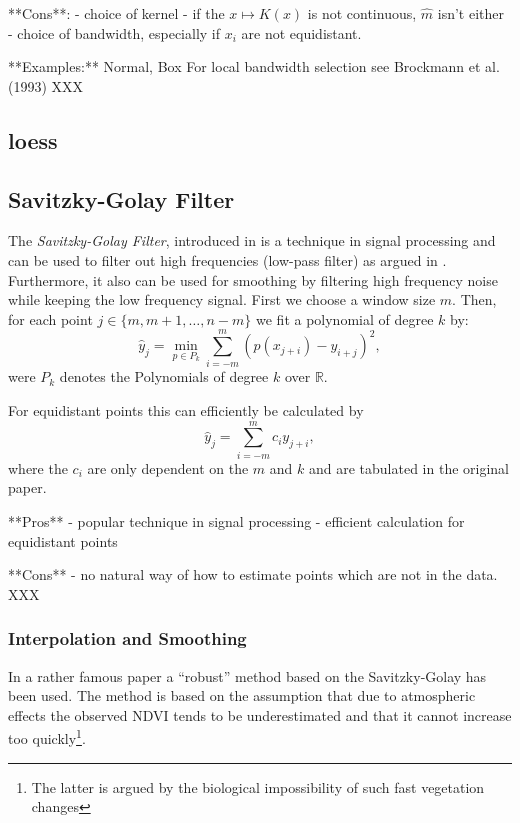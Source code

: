 **Cons**:
- choice of kernel
- if the $x \mapsto K(x)$ is not continuous, $\hat m $ isn't either
- choice of bandwidth, especially if $x_i$ are not equidistant.

**Examples:**
Normal, Box
For local bandwidth selection see Brockmann et al. (1993) XXX


\subsection{loess}
\label{sec:loess}


\subsection{Savitzky-Golay Filter}
\label{sec:Savitzky–Golay}
The \textit{Savitzky-Golay Filter}, introduced in \cite{savitzkySmoothingDifferentiationData1964} is a technique in signal processing and can be used to filter out high frequencies (low-pass filter) as argued in \cite{schaferWhatSavitzkyGolayFilter2011}. Furthermore, it also can be used for smoothing by filtering high frequency noise while keeping the low frequency signal.
First we choose a window size $m$. Then, for each point $j \in \{m, m+1, \dots, n-m\}$ we fit a polynomial of degree $k$ by:
$$\hat y_j=\min_{p\in P_k}\sum_{i=-m}^{m}(p (x_{j+i})-y_{i+j})^{2},$$
were $P_k$ denotes the Polynomials of degree $k$ over $\mathbb R$.

For equidistant points this can efficiently be calculated by
$$
    \hat y_{j}=\sum_{i=-m}^{m} c_{i} y_{j+i},
$$
where the $c_i$ are only dependent on the $m$ and $k$ and are tabulated in the original paper.

**Pros**
- popular technique in signal processing
- efficient calculation for equidistant points

**Cons**
- no natural way of how to estimate points which are not in the data. XXX

\subsubsection*{Interpolation and Smoothing}
In a rather famous paper \cite{chenSimpleMethodReconstructing2004a} a ``robust'' method based on the Savitzky-Golay has been used.
The method is based on the assumption that due to atmospheric effects the observed NDVI tends to be underestimated and that it cannot increase too quickly\footnote{The latter is argued by the biological impossibility of such fast vegetation changes}.

